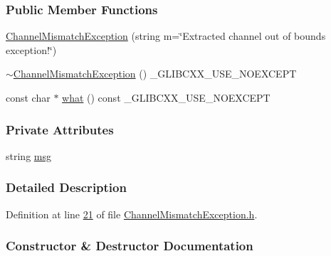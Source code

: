\subsubsection*{Public Member Functions}
\begin{DoxyCompactItemize}
\item 
\hyperlink{class_vision_1_1_exception_1_1_channel_mismatch_exception_a6fcbebd5e804c5b76b24506fe558d656}{Channel\+Mismatch\+Exception} (string m=\char`\"{}Extracted channel out of bounds exception!\char`\"{})
\item 
\hyperlink{class_vision_1_1_exception_1_1_channel_mismatch_exception_abef15b64f935832cc516696b68f6a012}{$\sim$\+Channel\+Mismatch\+Exception} () \+\_\+\+G\+L\+I\+B\+C\+X\+X\+\_\+\+U\+S\+E\+\_\+\+N\+O\+E\+X\+C\+E\+P\+T
\item 
const char $\ast$ \hyperlink{class_vision_1_1_exception_1_1_channel_mismatch_exception_acd5341496b3b5f49bba41c238a398a70}{what} () const \+\_\+\+G\+L\+I\+B\+C\+X\+X\+\_\+\+U\+S\+E\+\_\+\+N\+O\+E\+X\+C\+E\+P\+T
\end{DoxyCompactItemize}
\subsubsection*{Private Attributes}
\begin{DoxyCompactItemize}
\item 
string \hyperlink{class_vision_1_1_exception_1_1_channel_mismatch_exception_afa6ced18d6bf6cde0f907cb722470d60}{msg}
\end{DoxyCompactItemize}


\subsubsection{Detailed Description}


Definition at line \hyperlink{_channel_mismatch_exception_8h_source_l00021}{21} of file \hyperlink{_channel_mismatch_exception_8h_source}{Channel\+Mismatch\+Exception.\+h}.



\subsubsection{Constructor \& Destructor Documentation}
\hypertarget{class_vision_1_1_exception_1_1_channel_mismatch_exception_a6fcbebd5e804c5b76b24506fe558d656}{}
